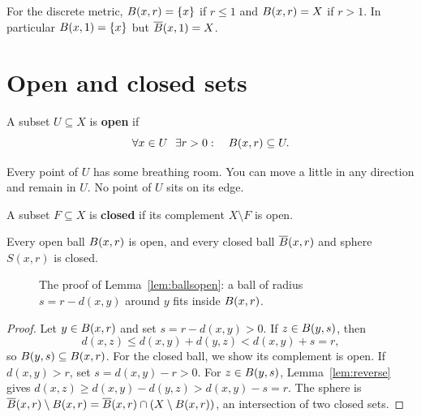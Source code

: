 \begin{example}
For the discrete metric, $B(x,r)=\{x\}$ if $r\le1$ and $B(x,r)=X$ if $r>1$. In particular $B(x,1)=\{x\}$ but $\overline{B}(x,1)=X$.
\end{example}

\section{Open and closed sets}
\begin{definition}\label{def:open}
A subset $U\subseteq X$ is \textbf{open} if
\[
  \forall x\in U\ \ \exists r>0:\quad \Bo(x,r)\subseteq U .
\]
\end{definition}

\begin{intuition}
Every point of $U$ has some breathing room. You can move a little in any direction and remain in $U$. No point of $U$ sits on its edge.
\end{intuition}

\begin{definition}\label{def:closed}
A subset $F\subseteq X$ is \textbf{closed} if its complement $X\setminus F$ is open.
\end{definition}

\begin{lemma}\label{lem:ballsopen}
Every open ball $B(x,r)$ is open, and every closed ball $\overline{B}(x,r)$ and sphere $S(x,r)$ is closed.
\end{lemma}

\begin{figure}[ht]
\centering
{}
\caption{The proof of Lemma~\ref{lem:ballsopen}: a ball of radius $s=r-d(x,y)$ around $y$ fits inside $B(x,r)$.}
\end{figure}

\begin{proof}
Let $y\in B(x,r)$ and set $s=r-d(x,y)>0$. If $z\in B(y,s)$, then
\[
  d(x,z)\le d(x,y)+d(y,z)<d(x,y)+s=r,
\]
so $B(y,s)\subseteq B(x,r)$. For the closed ball, we show its complement is open. If $d(x,y)>r$, set $s=d(x,y)-r>0$. For $z\in B(y,s)$, Lemma~\ref{lem:reverse} gives $d(x,z)\ge d(x,y)-d(y,z)>d(x,y)-s=r$. The sphere is $\overline{B}(x,r)\setminus B(x,r)=\overline{B}(x,r)\cap(X\setminus B(x,r))$, an intersection of two closed sets.
\end{proof}

